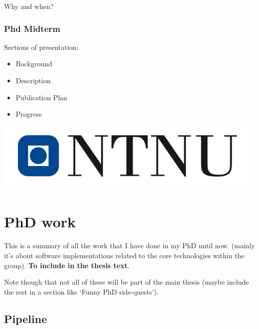 \documentclass[12pt,]{book}
\providecommand{\tightlist}{%
  \setlength{\itemsep}{0pt}\setlength{\parskip}{0pt}}
\begin{document}
Why and when?

\hypertarget{phd-midterm}{%
\subsection*{Phd Midterm}\label{phd-midterm}}

Sections of presentation:

\begin{itemize}
\tightlist
\item
  Background
\item
  Description
\item
  Publication Plan
\item
  Progress
\end{itemize}

\begin{center}\includegraphics[width=0.5\linewidth]{img/NTNU-logo} \end{center}

\hypertarget{work}{%
\chapter{PhD work}\label{work}}

This is a summary of all the work that I have done in my PhD until now.
(mainly it's about software implementations related to the core technologies
within the group). \textbf{To include in the thesis text}.

Note though that not all of these will be part of the main thesis (maybe include the
rest in a section like `Funny PhD side-quests').

\hypertarget{pipeline}{%
\section{Pipeline}\label{pipeline}}
\end{document}
